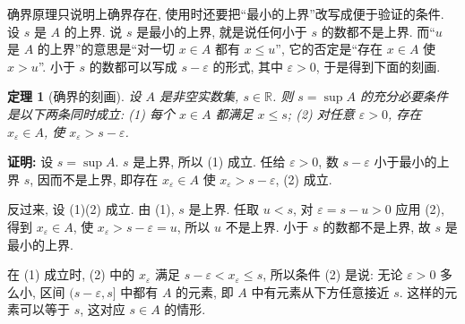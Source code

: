 \documentclass[UTF8,openany]{ctexbook}
\theoremstyle{chinesetextbook}
\newtheorem{theorem}{定理}[section]
\newenvironment{cnproof}{\par\indent\textbf{证明:} \ignorespaces}{\par}
\begin{document}
确界原理只说明上确界存在, 使用时还要把“最小的上界”改写成便于验证的条件. 设 $s$ 是 $A$ 的上界. 说 $s$ 是最小的上界, 就是说任何小于 $s$ 的数都不是上界. 而“$u$ 是 $A$ 的上界”的意思是“对一切 $x\in A$ 都有 $x\le u$”, 它的否定是“存在 $x\in A$ 使 $x>u$”. 小于 $s$ 的数都可以写成 $s-\varepsilon$ 的形式, 其中 $\varepsilon>0$, 于是得到下面的刻画.
\begin{theorem}[确界的刻画]
设 $A$ 是非空实数集, $s\in\mathbb R$. 则 $s=\sup A$ 的充分必要条件是以下两条同时成立: \textup{(1)} 每个 $x\in A$ 都满足 $x\le s$; \textup{(2)} 对任意 $\varepsilon>0$, 存在 $x_\varepsilon\in A$, 使 $x_\varepsilon>s-\varepsilon$.
\end{theorem}
\begin{cnproof}
设 $s=\sup A$. $s$ 是上界, 所以 (1) 成立. 任给 $\varepsilon>0$, 数 $s-\varepsilon$ 小于最小的上界 $s$, 因而不是上界, 即存在 $x_\varepsilon\in A$ 使 $x_\varepsilon>s-\varepsilon$, (2) 成立.

反过来, 设 (1)(2) 成立. 由 (1), $s$ 是上界. 任取 $u<s$, 对 $\varepsilon=s-u>0$ 应用 (2), 得到 $x_\varepsilon\in A$, 使 $x_\varepsilon>s-\varepsilon=u$, 所以 $u$ 不是上界. 小于 $s$ 的数都不是上界, 故 $s$ 是最小的上界.
\end{cnproof}
在 (1) 成立时, (2) 中的 $x_\varepsilon$ 满足 $s-\varepsilon<x_\varepsilon\le s$, 所以条件 (2) 是说: 无论 $\varepsilon>0$ 多么小, 区间 $(s-\varepsilon,s]$ 中都有 $A$ 的元素, 即 $A$ 中有元素从下方任意接近 $s$. 这样的元素可以等于 $s$, 这对应 $s\in A$ 的情形.
\end{document}
